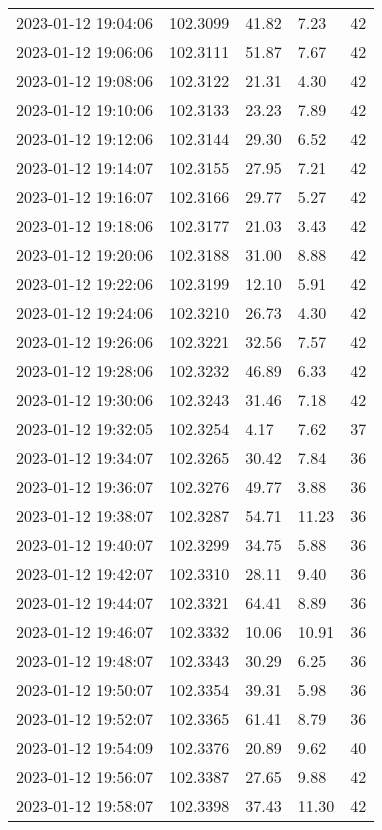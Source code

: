 \documentclass{nature_plusfigure}
\begin{document}
\begin{supplement}
\begin{center}
\begin{longtable}{lllll}
2023-01-12 19:04:06 & 102.3099 & 41.82 & 7.23 & 42 \\ 
2023-01-12 19:06:06 & 102.3111 & 51.87 & 7.67 & 42 \\ 
2023-01-12 19:08:06 & 102.3122 & 21.31 & 4.30 & 42 \\ 
2023-01-12 19:10:06 & 102.3133 & 23.23 & 7.89 & 42 \\ 
2023-01-12 19:12:06 & 102.3144 & 29.30 & 6.52 & 42 \\ 
2023-01-12 19:14:07 & 102.3155 & 27.95 & 7.21 & 42 \\ 
2023-01-12 19:16:07 & 102.3166 & 29.77 & 5.27 & 42 \\ 
2023-01-12 19:18:06 & 102.3177 & 21.03 & 3.43 & 42 \\ 
2023-01-12 19:20:06 & 102.3188 & 31.00 & 8.88 & 42 \\ 
2023-01-12 19:22:06 & 102.3199 & 12.10 & 5.91 & 42 \\ 
2023-01-12 19:24:06 & 102.3210 & 26.73 & 4.30 & 42 \\ 
2023-01-12 19:26:06 & 102.3221 & 32.56 & 7.57 & 42 \\ 
2023-01-12 19:28:06 & 102.3232 & 46.89 & 6.33 & 42 \\ 
2023-01-12 19:30:06 & 102.3243 & 31.46 & 7.18 & 42 \\ 
2023-01-12 19:32:05 & 102.3254 & 4.17 & 7.62 & 37 \\ 
2023-01-12 19:34:07 & 102.3265 & 30.42 & 7.84 & 36 \\ 
2023-01-12 19:36:07 & 102.3276 & 49.77 & 3.88 & 36 \\ 
2023-01-12 19:38:07 & 102.3287 & 54.71 & 11.23 & 36 \\ 
2023-01-12 19:40:07 & 102.3299 & 34.75 & 5.88 & 36 \\ 
2023-01-12 19:42:07 & 102.3310 & 28.11 & 9.40 & 36 \\ 
2023-01-12 19:44:07 & 102.3321 & 64.41 & 8.89 & 36 \\ 
2023-01-12 19:46:07 & 102.3332 & 10.06 & 10.91 & 36 \\ 
2023-01-12 19:48:07 & 102.3343 & 30.29 & 6.25 & 36 \\ 
2023-01-12 19:50:07 & 102.3354 & 39.31 & 5.98 & 36 \\ 
2023-01-12 19:52:07 & 102.3365 & 61.41 & 8.79 & 36 \\ 
2023-01-12 19:54:09 & 102.3376 & 20.89 & 9.62 & 40 \\ 
2023-01-12 19:56:07 & 102.3387 & 27.65 & 9.88 & 42 \\ 
2023-01-12 19:58:07 & 102.3398 & 37.43 & 11.30 & 42 \\ 

\end{longtable}
\end{center}
\end{supplement}
\end{document}
